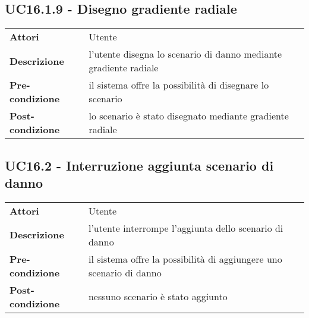 \subsection{UC16.1.9 - Disegno gradiente radiale}
\label{sssec:UC16.1.9}
\def\arraystretch{1.5}
\begin{tabularx}{\textwidth}{l|p{}}
\rowcolor{I} \multicolumn{2}{c}{\color{white}\textbf{UC16.1.9 - Disegno gradiente radiale}} \\
\toprule
\endhead
\textbf{Attori} & Utente\\
\textbf{Descrizione} & l'utente disegna lo scenario di danno mediante gradiente radiale\\
\textbf{Pre-condizione} & il sistema offre la possibilità di disegnare lo scenario\\
\textbf{Post-condizione} & lo scenario è stato disegnato mediante gradiente radiale\\
\bottomrule
\end{tabularx}
\subsection{UC16.2 - Interruzione aggiunta scenario di danno}
\label{sssec:UC16.2}
\def\arraystretch{1.5}
\begin{tabularx}{\textwidth}{l|p{}}
\rowcolor{I} \multicolumn{2}{c}{\color{white}\textbf{UC16.2 - Interruzione aggiunta scenario di danno}} \\
\toprule
\endhead
\textbf{Attori} & Utente\\
\textbf{Descrizione} & l'utente interrompe l'aggiunta dello scenario di danno\\
\textbf{Pre-condizione} & il sistema offre la possibilità di aggiungere uno scenario di danno\\
\textbf{Post-condizione} & nessuno scenario è stato aggiunto\\
\bottomrule
\end{tabularx}
